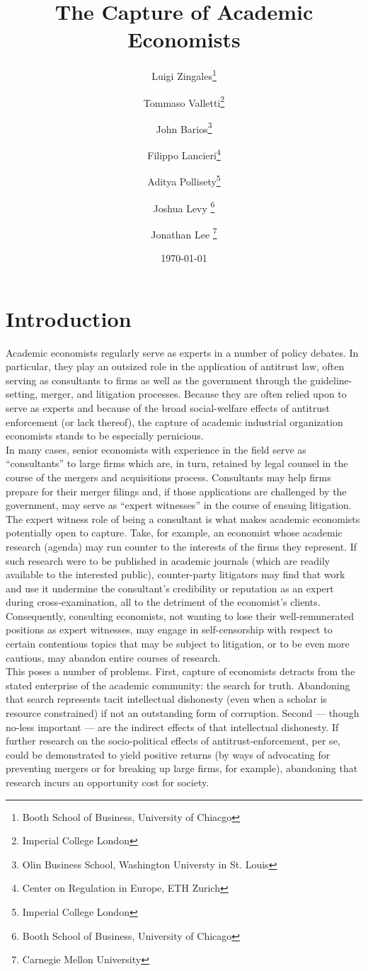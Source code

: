 \documentclass[11pt, letterpaper, twoside]{article}
\title{\singlespacing\textbf{The Capture of Academic Economists}}
\author{
    Luigi Zingales\thanks{Booth School of Business, University of Chiacgo} \\
    \and
    Tommaso Valletti\thanks{Imperial College London}\\
    \and
    John Barios\thanks{Olin Business School, Washington Universty in St. Louis}\\
    \and
    Filippo Lancieri\thanks{Center on Regulation in Europe, ETH Zurich} \\
    \and
    Aditya Pollisety\thanks{Imperial College London}\\
    \and
    Joshua Levy \thanks{Booth School of Business, University of Chicago}\\
    \and
    Jonathan Lee \thanks{Carnegie Mellon University}
    }
\date{\today}
\begin{document}
\begin{titlepage}   
    \maketitle
    \thispagestyle{empty}
\end{titlepage}


\newpage
{}

\section{Introduction}
Academic economists regularly serve as experts in a number of policy debates. In particular, they play an outsized role in the application of antitrust law, often serving as consultants to firms as well as the government through the guideline-setting, merger, and litigation processes. Because they are often relied upon to serve as experts and because of the broad social-welfare effects of antitrust enforcement (or lack thereof), the capture of academic industrial organization economists stands to be especially pernicious.\\

In many cases, senior economists with experience in the field serve as ``consultants'' to large firms which are, in turn, retained by legal counsel in the course of the mergers and acquisitions process. Consultants may help firms prepare for their merger filings and, if those applications are challenged by the government, may serve as ``expert witnesses'' in the course of ensuing litigation. The expert witness role of being a consultant is what makes academic economists potentially open to capture. Take, for example, an economist whose academic research (agenda) may run counter to the interests of the firms they represent. If such research were to be published in academic journals (which are readily available to the interested public), counter-party litigators may find that work and use it undermine the consultant's credibility or reputation as an expert during cross-examination, all to the detriment of the economist's clients. Consequently, consulting economists, not wanting to lose their well-remunerated positions as expert witnesses, may engage in self-censorship with respect to certain contentious topics that may be subject to litigation, or to be even more cautious, may abandon entire courses of research.\\

This poses a number of problems. First, capture of economists detracts from the stated enterprise of the academic community: the search for truth. Abandoning that search represents tacit intellectual dishonesty (even when a scholar is resource constrained) if not an outstanding form of corruption. Second --- though no-less important --- are the indirect effects of that intellectual dishonesty. If further research on the socio-political effects of antitrust-enforcement, per se, could be demonstrated to yield positive returns (by ways of advocating for preventing mergers or for breaking up large firms, for example), abandoning that research incurs an opportunity cost for society.\\
\end{document}
